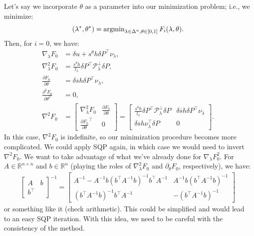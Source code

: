 \documentclass[eikonal.tex]{subfiles}
\begin{document}
Let's say we incorporate $\theta$ as a parameter into our minimization
problem; i.e., we minimize:
\begin{equation}
  (\lambda^*, \theta^*) = \operatorname{argmin}_{\lambda \in \Delta^n, \theta \in [0, 1]} F_i(\lambda, \theta).
\end{equation}
Then, for $i = 0$, we have:
\begin{align*}
  \nabla_\lambda F_0 &= \delta u + s^\theta h \delta P^\top \nu_\lambda, \\
  \nabla_\lambda^2 F_0 &= \frac{s^\theta h}{l_\lambda} \delta P^\top \mathcal{P}_\lambda^\perp \delta P, \\
  \frac{\partial F_0}{\partial \theta} &= \delta \overline{s} h \delta P^\top \nu_\lambda, \\
  \frac{\partial^2 F_0}{\partial \theta^2} &= 0, \\
  \nabla^2 F_0 &= \begin{bmatrix}
    \nabla_\lambda^2 F_0 & \frac{\partial F_0}{\partial \theta} \\
    \frac{\partial F_0}{\partial \theta}^\top & 0
  \end{bmatrix} = \begin{bmatrix}
    \frac{s^\theta h}{l_\lambda} \delta P^\top \mathcal{P}_\lambda^\perp \delta P & \delta \overline{s} h \delta P^\top \nu_\lambda \\
    \delta \overline{s} h \nu_\lambda^\top \delta P  & 0
  \end{bmatrix}.
\end{align*}
In this case, $\nabla^2 F_0$ is indefinite, so our minimization
procedure becomes more complicated. We could apply SQP again, in which
case we would need to invert $\nabla^2 F_0$. We want to take advantage
of what we've already done for $\nabla_\lambda F_0^2$. For
$A \in \mathbb{R}^{n \times n}$ and $b \in \mathbb{R}^{n}$ (playing
the roles of $\nabla_\lambda^2 F_0$ and $\partial_\theta F_0$,
respectively), we have:
\begin{align*}
  \begin{bmatrix}
    A & b \\
    b^\top &
  \end{bmatrix}^{-1} = \begin{bmatrix}
    A^{-1} - A^{-1} b (b^\top A^{-1} b)^{-1} b^\top A^{-1} & A^{-1} b (b^\top A^{-1} b)^{-1} \\
    (b^\top A^{-1} b)^{-1} b^\top A^{-1} & -(b^\top A^{-1} b)^{-1}
  \end{bmatrix}
\end{align*}
or something like it (check arithmetic). This could be simplified and
would lead to an easy SQP iteration. With this idea, we need to be
careful with the consistency of the method.
\end{document}
